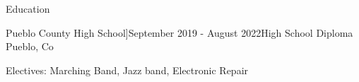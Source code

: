 \documentclass{resume} %
\begin{document}
\begin{rSection}{Education}
        \begin{rSubsection}{Pueblo County High School]}{September 2019 - August 2022}{High School Diploma }{Pueblo, Co}
  \item Electives: Marching Band, Jazz band, Electronic Repair
  \end{rSubsection}
\end{rSection}
\end{document}
